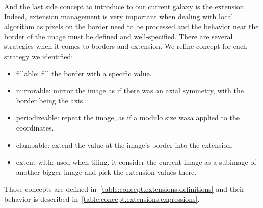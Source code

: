 And the last side concept to introduce to our current galaxy is the extension. Indeed, extension management is very
important when dealing with local algorithm as pixels on the border need to be processed and the behavior near the
border of the image must be defined and well-specified. There are several strategies when it comes to borders and extension.
We refine concept for each strategy we identified:
\begin{itemize}
  \item fillable: fill the border with a specific value.
  \item mirrorable: mirror the image as if there was an axial symmetry, with the border being the axis.
  \item periodizeable: repeat the image, as if a modulo size wasa applied to the coordinates.
  \item clampable: extend the value at the image's border into the extension.
  \item extent with: used when tiling. it consider the current image as a subimage of another bigger image and pick the
        extension values there.
\end{itemize}
Those concepts are defined in~\cref{table:concept.extensions.definitions} and their behavior is described
in~\cref{table:concept.extensions.expressions}.

